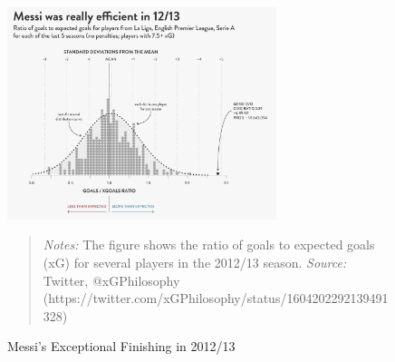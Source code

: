 \begin{figure}[h!]
    \centering
    \includegraphics[width=0.7\textwidth]{graphics/messi_2012.jpg}
    \caption{Messi's Exceptional Finishing in 2012/13}
    \label{fig:messi_goals_xg_2012}
    \begin{quote}
        \textit{Notes:} 
        The figure shows the ratio of goals to expected goals (xG) for several 
        players in the 2012/13 season.
        \textit{Source:} Twitter, @xGPhilosophy (https://twitter.com/xGPhilosophy/status/1604202292139491328) 
    \end{quote} 
\end{figure}
